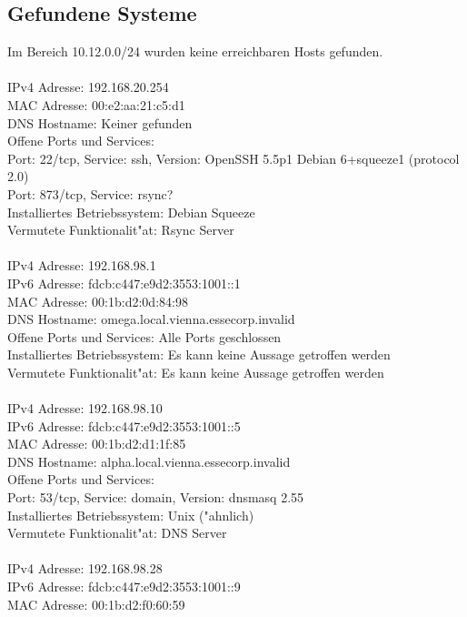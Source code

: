 \documentclass[12pt,a4paper,titlepage,oneside]{scrartcl}
\begin{document}
\subsection{Gefundene Systeme}
Im Bereich 10.12.0.0/24 wurden keine erreichbaren Hosts gefunden.\\
\\
IPv4 Adresse: 192.168.20.254\\
MAC Adresse: 00:e2:aa:21:c5:d1\\
DNS Hostname: Keiner gefunden\\
Offene Ports und Services:\\
Port: 22/tcp, Service: ssh, Version: OpenSSH 5.5p1 Debian 6+squeeze1 (protocol 2.0)\\
Port: 873/tcp, Service: rsync?\\
Installiertes Betriebssystem: Debian Squeeze\\
Vermutete Funktionalit"at: Rsync Server\\
\\
IPv4 Adresse: 192.168.98.1\\
IPv6 Adresse: fdcb:c447:e9d2:3553:1001::1\\
MAC Adresse: 00:1b:d2:0d:84:98\\
DNS Hostname: omega.local.vienna.essecorp.invalid\\
Offene Ports und Services: Alle Ports geschlossen
\\
Installiertes Betriebssystem: Es kann keine Aussage getroffen werden\\
Vermutete Funktionalit"at: Es kann keine Aussage getroffen werden\\
\\
IPv4 Adresse: 192.168.98.10\\
IPv6 Adresse: fdcb:c447:e9d2:3553:1001::5\\
MAC Adresse: 00:1b:d2:d1:1f:85\\
DNS Hostname: alpha.local.vienna.essecorp.invalid\\
Offene Ports und Services:\\
Port: 53/tcp, Service: domain, Version: dnsmasq 2.55\\
Installiertes Betriebssystem: Unix ("ahnlich)\\
Vermutete Funktionalit"at: DNS Server\\
\\
IPv4 Adresse: 192.168.98.28\\
IPv6 Adresse: fdcb:c447:e9d2:3553:1001::9\\
MAC Adresse: 00:1b:d2:f0:60:59\\
\end{document}
